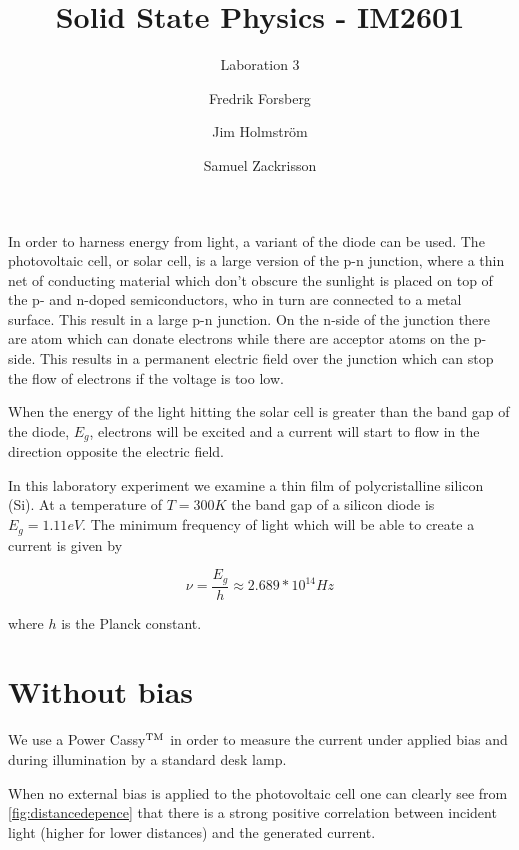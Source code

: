 \documentclass[a4paper,twoside=false,abstract=false,numbers=noenddot,
titlepage=false,headings=small,parskip=half,version=last]{scrartcl}
\title{Solid State Physics - IM2601}
\subtitle{Laboration 3}
\author[1]{Fredrik Forsberg}
\author[1]{Jim Holmström}
\author[1]{Samuel Zackrisson}
\affil[1]{Engineering Physics, Royal Institute of Technology}
\affil[1]{\{fforsber, jimho, samuelz\}@kth.se}
\begin{document}
\maketitle
\thispagestyle{empty}


In order to harness energy from light, a variant of the diode can be used. The
photovoltaic cell, or solar cell, is a large version of the p-n junction, where a thin net of conducting material
which don't obscure the sunlight is placed on top of the p- and n-doped semiconductors,
who in turn are connected to a metal surface. This result in a large p-n junction.
On the n-side of the junction there are atom which can donate electrons while there are acceptor
atoms on the p-side.
This results in a permanent electric field over the junction which can stop the flow of electrons if the voltage is too low.

When the energy of the light hitting the solar cell is greater than the band gap of the diode, $E_g$, electrons will be excited and a current will start to flow in the direction opposite the electric field.

In this laboratory experiment we examine a thin film of polycristalline silicon (Si). At a temperature of $T = 300 K$ the band gap of a silicon diode is $E_g=1.11 eV$. The minimum frequency of light which will be able to create a current is given by

\begin{equation}
    \nu = \frac{E_g}{h} \approx 2.689*10^{14} Hz
\end{equation}

where $h$ is the Planck constant.

\section{Without bias}

We use a Power Cassy$\textsuperscript{TM}$ in order to measure the current under applied bias and during illumination by a standard desk lamp.

When no external bias is applied to the photovoltaic cell one can clearly see
from \ref{fig:distancedepence} that there is a strong positive correlation between
incident light (higher for lower distances) and the generated current.

\end{document}

